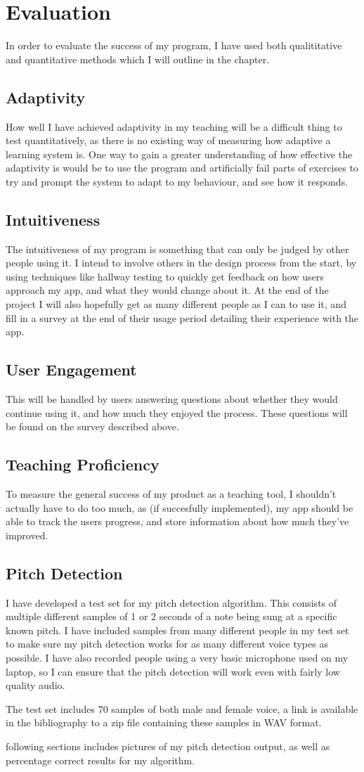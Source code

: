 \chapter{Evaluation}

In order to evaluate the success of my program, I have used both qualititative and quantitative methods which I will outline in the chapter.

\section{Adaptivity}
How well I have achieved adaptivity in my teaching will be a difficult thing to test quantitatively, as there is no existing way of measuring how adaptive a learning system is. One way to gain a greater understanding of how effective the adaptivity is would be to use the program and artificially fail parts of exercises to try and prompt the system to adapt to my behaviour, and see how it responds.

\section{Intuitiveness}
The intuitiveness of my program is something that can only be judged by other people using it. I intend to involve others in the design process from the start, by using techniques like hallway testing to quickly get feedback on how users approach my app, and what they would change about it. At the end of the project I will also hopefully get as many different people as I can to use it, and fill in a survey at the end of their usage period detailing their experience with the app.
\section{User Engagement}
This will be handled by users answering questions about whether they would continue using it, and how much they enjoyed the process. These questions will be found on the survey described above.

\section{Teaching Proficiency}
To measure the general success of my product as a teaching tool, I shouldn't actually have to do too much, as (if succesfully implemented), my app should be able to track the users progress, and store information about how much they've improved.

\section{Pitch Detection}
I have developed a test set for my pitch detection algorithm. This consists of multiple different samples of 1 or 2 seconds of a note being sung at a specific known pitch. I have included samples from many different people in my test set to make sure my pitch detection works for as many different voice types as possible. I have also recorded people using a very basic microphone used on my laptop, so I can ensure that the pitch detection will work even with fairly low quality audio. 

The test set includes 70 samples of both male and female voice, a link is available in the bibliography to a zip file containing these samples in WAV format.


following sections includes pictures of my pitch detection output, as well as percentage correct results for my algorithm.